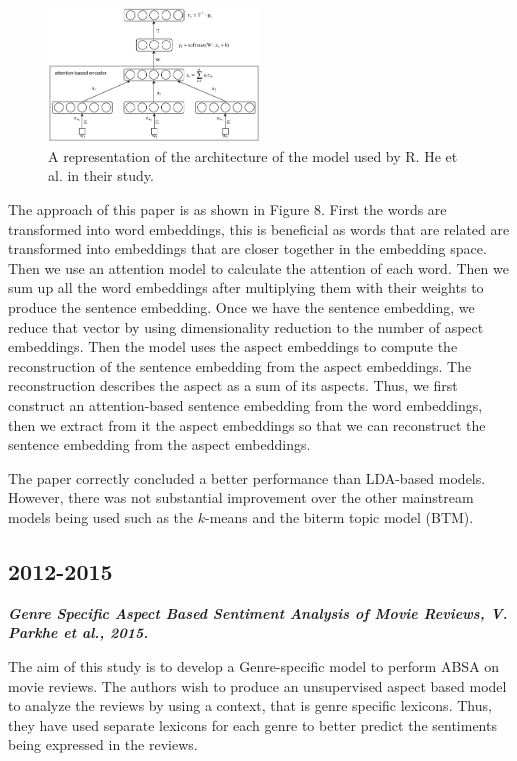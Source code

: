 \documentclass[conference]{IEEEtran}
\begin{document}
\begin{figure}[htbp]
\centerline{\includegraphics[keepaspectratio, width=0.5\textwidth]{pics/8.png}}
\caption{A representation of the architecture of the model used by R. He et al. in their study.}
\label{fig}
\end{figure}

The approach of this paper is as shown in Figure 8. First the words are transformed into word embeddings, this is beneficial as words that are related are transformed into embeddings that are closer together in the embedding space. Then we use an attention model to calculate the attention of each word. Then we sum up all the word embeddings after multiplying them with their weights to produce the sentence embedding. Once we have the sentence embedding, we reduce that vector by using dimensionality reduction to the number of aspect embeddings. Then the model uses the aspect embeddings to compute the reconstruction of the sentence embedding from the aspect embeddings. The reconstruction describes the aspect as a sum of its aspects. Thus, we first construct an attention-based sentence embedding from the word embeddings, then we extract from it the aspect embeddings so that we can reconstruct the sentence embedding from the aspect embeddings.

The paper correctly concluded a better performance than LDA-based models. However, there was not substantial improvement over the other mainstream models being used such as the $k$-means and the biterm topic model (BTM).\\

\subsection{2012-2015}

\textit{\textbf{Genre Specific Aspect Based Sentiment Analysis of Movie Reviews, V. Parkhe et al., 2015.}}

The aim of this study is to develop a Genre-specific model to perform ABSA on movie reviews. The authors wish to produce an unsupervised aspect based model to analyze the reviews by using a context, that is genre specific lexicons. Thus, they have used separate lexicons for each genre to better predict the sentiments being expressed in the reviews.
\end{document}
